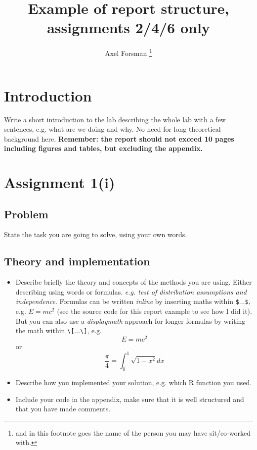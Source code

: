 \documentclass[11pt,a4paper]{article}
\title{Example of report structure, assignments 2/4/6 only}
\author{Axel Forsman \footnote{and in this footnote goes the name of the person you may have sit/co-worked with.}}
\begin{document}
\maketitle

\section{Introduction}
Write a short introduction to the lab describing the whole lab with a few sentences, e.g. what are we doing and why. No need for long theoretical background here. \textbf{Remember: the report should not exceed 10 pages including figures and tables, but excluding the appendix.}

\section{Assignment 1(i)}
\subsection{Problem}
State the task you are going to solve, using your own words.
\subsection{Theory and implementation}
\begin{itemize}
\item Describe briefly the theory and concepts of the methods you are using. Either describing using words or formulas. \emph{e.g. test of distribution assumptions and independence}. Formulas can be written \textit{inline} by inserting maths within \verb|$|...\verb|$|, e.g. $E=mc^2$ (see the source code for this report example to see how I did it). But you can also use a \textit{displaymath} approach for longer formulas by writing the math within \verb|\[|...\verb|\]|, e.g.
\[
E=mc^2
\]
or
\[
\frac{\pi}{4}=\int_0^1 \sqrt{1-x^2}dx
\]
\item Describe how you implemented your solution, e.g. which R function you used.
\item Include your code in the appendix, make sure that it is well structured and that you have made comments.
\end{itemize}
\end{document}
